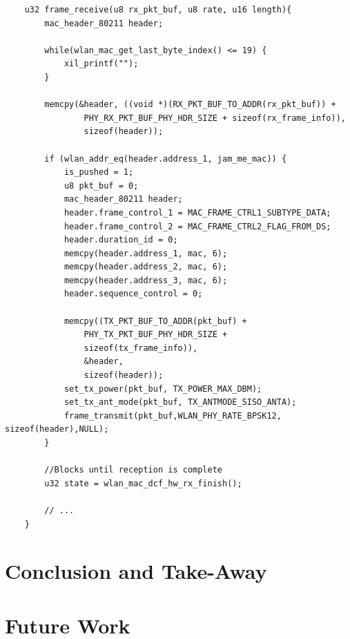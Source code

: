 \documentclass[sigconf]{acmart}
\begin{document}
\begin{verbatim}
	u32 frame_receive(u8 rx_pkt_buf, u8 rate, u16 length){
		mac_header_80211 header;

		while(wlan_mac_get_last_byte_index() <= 19) {
			xil_printf("");
		}

		memcpy(&header, ((void *)(RX_PKT_BUF_TO_ADDR(rx_pkt_buf)) + 
				PHY_RX_PKT_BUF_PHY_HDR_SIZE + sizeof(rx_frame_info)), 
				sizeof(header));

		if (wlan_addr_eq(header.address_1, jam_me_mac)) {
			is_pushed = 1;
			u8 pkt_buf = 0;
			mac_header_80211 header;
			header.frame_control_1 = MAC_FRAME_CTRL1_SUBTYPE_DATA;
			header.frame_control_2 = MAC_FRAME_CTRL2_FLAG_FROM_DS;
			header.duration_id = 0;
			memcpy(header.address_1, mac, 6);
			memcpy(header.address_2, mac, 6);
			memcpy(header.address_3, mac, 6);
			header.sequence_control = 0;

			memcpy((TX_PKT_BUF_TO_ADDR(pkt_buf) + 
				PHY_TX_PKT_BUF_PHY_HDR_SIZE + 
				sizeof(tx_frame_info)), 
				&header, 
				sizeof(header));
			set_tx_power(pkt_buf, TX_POWER_MAX_DBM);
			set_tx_ant_mode(pkt_buf, TX_ANTMODE_SISO_ANTA);
			frame_transmit(pkt_buf,WLAN_PHY_RATE_BPSK12, sizeof(header),NULL);
		}

		//Blocks until reception is complete
		u32 state = wlan_mac_dcf_hw_rx_finish(); 
		
		// ...
	}
\end{verbatim}


\section{Conclusion and Take-Away}

\section{Future Work}



 
\end{document}
